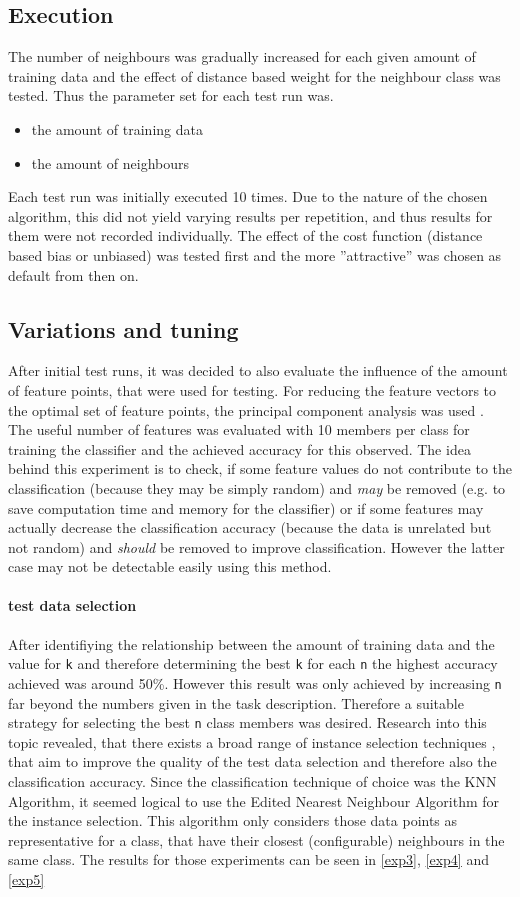 \documentclass[10pt,a4paper]{proc}
\begin{document}
\subsection*{Execution}
The number of neighbours was gradually increased for each given amount of training data and the effect of distance based weight for the neighbour class was tested. Thus the parameter set for each test run was.
\begin{itemize}
\item the amount of training data
\item the amount of neighbours
\end{itemize}
Each test run was initially executed 10 times. Due to the nature of the chosen algorithm, this did not yield varying results per repetition, and thus results for them were not recorded individually. The effect of the cost function (distance based bias or unbiased) was tested first and the more ''attractive'' was chosen as default from then on. 
\subsection{Variations and tuning}\label{substune}
After initial test runs, it was decided to also evaluate the influence of the amount of feature points, that were used for testing. For reducing the feature vectors to the optimal set of feature points, the principal component analysis was used \cite{wold1987principal}. The useful number of features was evaluated with 10 members per class for training the classifier and the achieved accuracy for this observed. The idea behind this experiment is to check, if some feature values do not contribute to the classification (because they may be simply random) and \textit{may} be removed (e.g. to save computation time and memory for the classifier) or if some features may actually decrease the classification accuracy (because the data is unrelated but not random) and \textit{should} be removed to improve classification. However the latter case may not be detectable easily using this method.
\paragraph*{test data selection}
After identifiying the relationship between the amount of training data and the value for \texttt{k} and therefore determining the best \texttt{k} for each \texttt{n} the highest accuracy achieved was around 50\%. However this result was only achieved by increasing \texttt{n} far beyond the numbers given in the task description. Therefore a suitable strategy for selecting the best \texttt{n} class members was desired. Research into this topic revealed, that there exists a broad range of instance selection techniques \cite{arnaiz2018estudio}, that aim to improve the quality of the test data selection and therefore also the classification accuracy. Since the classification technique of choice was the KNN Algorithm, it seemed logical to use the Edited Nearest Neighbour Algorithm for the instance selection. This algorithm only considers those data points as representative for a class, that have their closest (configurable) neighbours in the same class. The results for those experiments can be seen in \ref{exp3}, \ref{exp4} and \ref{exp5} 
\end{document}
